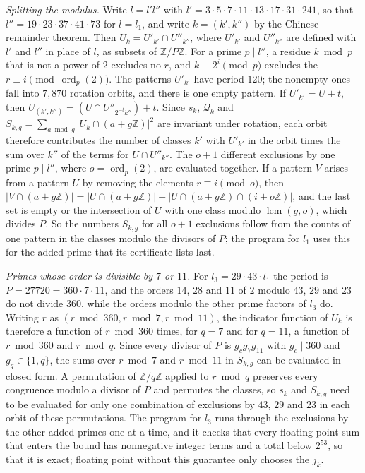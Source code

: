 \documentclass[11pt]{amsart}
\theoremstyle{definition}
\theoremstyle{remark}
\numberwithin{equation}{section}
\newcommand{\ord}{\operatorname{ord}}
\newcommand{\lcm}{\operatorname{lcm}}
\newcommand{\PerG}{27720}
\newcommand{\PerO}{120}
\begin{document}
\emph{Splitting the modulus.} Write $l=l'l''$ with $l'=3\cdot5\cdot7\cdot11\cdot13\cdot17\cdot31\cdot241$, so that $l''=19\cdot23\cdot37\cdot41\cdot73$ for $l=l_1$, and write $k=(k',k'')$ by the Chinese remainder theorem. Then $U_k=U'_{k'}\cap U''_{k''}$, where $U'_{k'}$ and $U''_{k''}$ are defined with $l'$ and $l''$ in place of $l$, as subsets of $\mathbb Z/P\mathbb Z$. For a prime $p\mid l''$, a residue $k\bmod p$ that is not a power of $2$ excludes no $r$, and $k\equiv2^i\pmod p$ excludes the $r\equiv i\pmod{\ord_p(2)}$. The patterns $U'_{k'}$ have period $\PerO$; the nonempty ones fall into $7{,}870$ rotation orbits, and there is one empty pattern. If $U'_{k'}=U+t$, then $U_{(k',k'')}=(U\cap U''_{2^{-t}k''})+t$. Since $s_k$, $\mathcal Q_k$ and $S_{k,g}=\sum_{a\bmod g}|U_k\cap(a+g\mathbb Z)|^2$ are invariant under rotation, each orbit therefore contributes the number of classes $k'$ with $U'_{k'}$ in the orbit times the sum over $k''$ of the terms for $U\cap U''_{k''}$. The $o+1$ different exclusions by one prime $p\mid l''$, where $o=\ord_p(2)$, are evaluated together. If a pattern $V$ arises from a pattern $U$ by removing the elements $r\equiv i\pmod o$, then $|V\cap(a+g\mathbb Z)|=|U\cap(a+g\mathbb Z)|-|U\cap(a+g\mathbb Z)\cap(i+o\mathbb Z)|$, and the last set is empty or the intersection of $U$ with one class modulo $\lcm(g,o)$, which divides $P$. So the numbers $S_{k,g}$ for all $o+1$ exclusions follow from the counts of one pattern in the classes modulo the divisors of $P$; the program for $l_1$ uses this for the added prime that its certificate lists last.

\emph{Primes whose order is divisible by $7$ or $11$.} For $l_3=29\cdot43\cdot l_1$ the period is $P=\PerG=360\cdot7\cdot11$, and the orders $14$, $28$ and $11$ of $2$ modulo $43$, $29$ and $23$ do not divide $360$, while the orders modulo the other prime factors of $l_3$ do. Writing $r$ as $(r\bmod360,r\bmod7,r\bmod11)$, the indicator function of $U_k$ is therefore a function of $r\bmod360$ times, for $q=7$ and for $q=11$, a function of $r\bmod360$ and $r\bmod q$. Since every divisor of $P$ is $g_cg_7g_{11}$ with $g_c\mid360$ and $g_q\in\{1,q\}$, the sums over $r\bmod7$ and $r\bmod11$ in $S_{k,g}$ can be evaluated in closed form. A permutation of $\mathbb Z/q\mathbb Z$ applied to $r\bmod q$ preserves every congruence modulo a divisor of $P$ and permutes the classes, so $s_k$ and $S_{k,g}$ need to be evaluated for only one combination of exclusions by $43$, $29$ and $23$ in each orbit of these permutations. The program for $l_3$ runs through the exclusions by the other added primes one at a time, and it checks that every floating-point sum that enters the bound has nonnegative integer terms and a total below $2^{53}$, so that it is exact; floating point without this guarantee only chooses the $j_k$.
\end{document}
